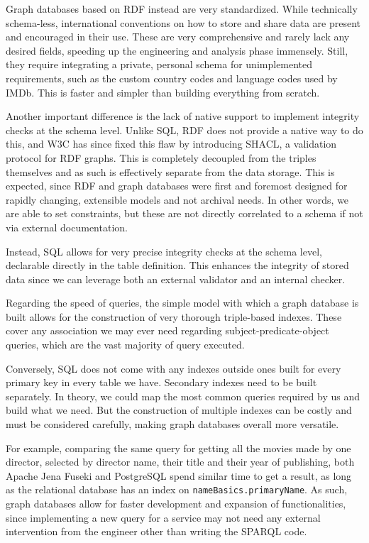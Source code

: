 \documentclass[a4paper,10pt]{article}
\begin{document}
Graph databases based on RDF instead are very standardized. While
technically schema-less, international conventions on how to store and
share data are present and encouraged in their use. These are very
comprehensive and rarely lack any desired fields, speeding up the
engineering and analysis phase immensely. Still, they require
integrating a private, personal schema for unimplemented requirements,
such as the custom country codes and language codes used by IMDb. This
is faster and simpler than building everything from scratch.

Another important difference is the lack of native support to
implement integrity checks at the schema level. Unlike SQL, RDF does
not provide a native way to do this, and W3C has since fixed this flaw
by introducing SHACL, a validation protocol for RDF graphs. This is
completely decoupled from the triples themselves and as such is
effectively separate from the data storage. This is expected, since
RDF and graph databases were first and foremost designed for rapidly
changing, extensible models and not archival needs. In other words, we
are able to set constraints, but these are not directly correlated to
a schema if not via external documentation.

Instead, SQL allows for very precise integrity checks at the schema
level, declarable directly in the table definition. This enhances the
integrity of stored data since we can leverage both an external
validator and an internal checker.

Regarding the speed of queries, the simple model with which a graph
database is built allows for the construction of very thorough
triple-based indexes. These cover any association we may ever need
regarding subject-predicate-object queries, which are the vast
majority of query executed.

Conversely, SQL does not come with any indexes outside ones built for
every primary key in every table we have. Secondary indexes need to be
built separately. In theory, we could map the most common queries
required by us and build what we need. But the construction of
multiple indexes can be costly and must be considered carefully,
making graph databases overall more versatile.

For example, comparing the same query for getting all the movies made
by one director, selected by director name, their title and their year
of publishing, both Apache Jena Fuseki and PostgreSQL spend similar
time to get a result, as long as the relational database has an index
on \texttt{nameBasics.primaryName}. As such, graph databases allow for
faster development and expansion of functionalities, since
implementing a new query for a service may not need any external
intervention from the engineer other than writing the SPARQL code.
\end{document}
